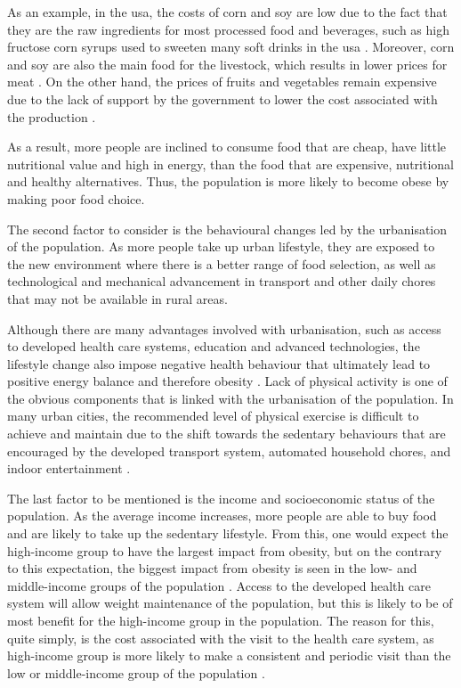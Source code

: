 As an example, in the \gls{usa}, the costs of corn and soy are low due to the fact that they are the raw ingredients for most processed food and beverages, such as high fructose corn syrups used to sweeten many soft drinks in the \gls{usa} \citep{Malik2013}.
Moreover, corn and soy are also the main food for the livestock, which results in lower prices for meat \citep{Malik2013}.
On the other hand, the prices of fruits and vegetables remain expensive due to the lack of support by the government to lower the cost associated with the production \citep{Malik2013}.

As a result, more people are inclined to consume food that are cheap, have little nutritional value and high in energy, than the food that are expensive, nutritional and healthy alternatives.
Thus, the population is more likely to become obese by making poor food choice.

The second factor to consider is the behavioural changes led by the urbanisation of the population.
As more people take up urban lifestyle, they are exposed to the new environment where there is a better range of food selection, as well as technological and mechanical advancement in transport and other daily chores that may not be available in rural areas.

Although there are many advantages involved with urbanisation, such as access to developed health care systems, education and advanced technologies, the lifestyle change also impose negative health behaviour that ultimately lead to positive energy balance and therefore obesity \citep{Malik2013}.
Lack of physical activity is one of the obvious components that is linked with the urbanisation of the population.
In many urban cities, the recommended level of physical exercise is difficult to achieve and maintain due to the shift towards the sedentary behaviours that are encouraged by the developed transport system, automated household chores, and indoor entertainment \citep{Malik2013}.

The last factor to be mentioned is the income and socioeconomic status of the population.
As the average income increases, more people are able to buy food and are likely to take up the sedentary lifestyle.
From this, one would expect the high-income group to have the largest impact from obesity, but on the contrary to this expectation, the biggest impact from obesity is seen in the low- and middle-income groups of the population \citep{Malik2013}.
Access to the developed health care system will allow weight maintenance of the population, but this is likely to be of most benefit for the high-income group in the population.
The reason for this, quite simply, is the cost associated with the visit to the health care system, as high-income group is more likely to make a consistent and periodic visit than the low or middle-income group of the population \citep{Malik2013}.

